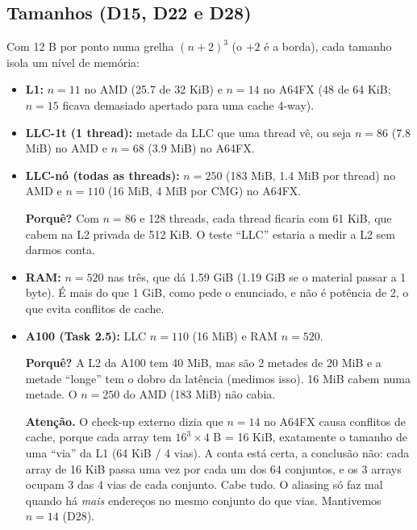 \documentclass[11pt,a4paper]{article}
\newcommand{\porque}[1]{\par\noindent\colorbox{blue!6}{\parbox{\dimexpr\linewidth-2\fboxsep}{\small\textbf{Porquê?} #1}}\par}
\newcommand{\cuidado}[1]{\par\noindent\colorbox{orange!10}{\parbox{\dimexpr\linewidth-2\fboxsep}{\small\textbf{Atenção.} #1}}\par}
\begin{document}
\subsection{Tamanhos (D15, D22 e D28)}
Com 12 B por ponto numa grelha $(n+2)^3$ (o $+2$ é a borda), cada tamanho isola um nível de memória:
\begin{itemize}
\item \textbf{L1:} $n=11$ no AMD (25.7 de 32 KiB) e $n=14$ no A64FX (48 de 64 KiB; $n=15$ ficava
demasiado apertado para uma cache 4-way).
\item \textbf{LLC-1t (1 thread):} metade da LLC que uma thread vê, ou seja $n=86$ (7.8 MiB) no AMD e
$n=68$ (3.9 MiB) no A64FX.
\item \textbf{LLC-nó (todas as threads):} $n=250$ (183 MiB, 1.4 MiB por thread) no AMD e $n=110$
(16 MiB, 4 MiB por CMG) no A64FX.
\porque{Com $n=86$ e 128 threads, cada thread ficaria com 61 KiB, que cabem na L2 privada de 512 KiB. O
teste ``LLC'' estaria a medir a L2 sem darmos conta.}
\item \textbf{RAM:} $n=520$ nas três, que dá 1.59 GiB (1.19 GiB se o material passar a 1 byte).
É mais do que 1 GiB, como pede o enunciado, e não é potência de 2, o que evita conflitos de cache.
\item \textbf{A100 (Task 2.5):} LLC $n=110$ (16 MiB) e RAM $n=520$.
\porque{A L2 da A100 tem 40 MiB, mas são 2 metades de 20 MiB e a metade ``longe'' tem o dobro da
latência (medimos isso). 16 MiB cabem numa metade. O $n=250$ do AMD (183 MiB) não cabia.}
\cuidado{O check-up externo dizia que $n=14$ no A64FX causa conflitos de cache, porque cada array tem
$16^3\times4$ B = 16 KiB, exatamente o tamanho de uma ``via'' da L1 (64 KiB / 4 vias). A conta está
certa, a conclusão não: cada array de 16 KiB passa uma vez por cada um dos 64 conjuntos, e os 3 arrays
ocupam 3 das 4 vias de cada conjunto. Cabe tudo. O aliasing só faz mal quando há \emph{mais} endereços
no mesmo conjunto do que vias. Mantivemos $n=14$ (D28).}
\end{itemize}
\end{document}
